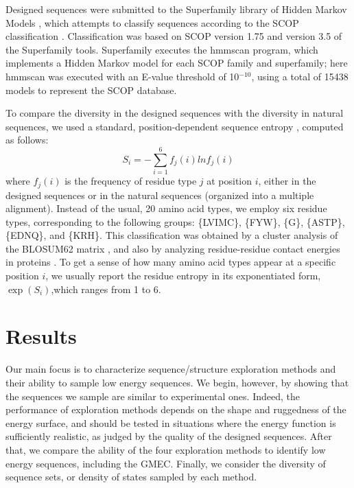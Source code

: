 Designed sequences were submitted to the Superfamily library of Hidden Markov Models \cite{Gough01,Wilson07}, which attempts to classify sequences according to the SCOP classification \cite{Andreeva04}. Classification was based on SCOP version 1.75 and version 3.5 of the Superfamily tools. Superfamily executes the hmmscan program, which implements a Hidden Markov model for each SCOP family and superfamily; here hmmscan was executed with an E-value threshold of 10$^{-10}$, using a total of 15438 models to represent the SCOP database.

To compare the diversity in the designed sequences with the diversity in natural sequences, we used a standard, position-dependent sequence entropy \cite{DurbinBK}, computed as follows:
\begin{equation} \label{eq:entropy}
S_i = - \sum_{i=1}^6 f_j (i) ln f_j (i)
\end{equation}
where $f_j(i)$ is the frequency of residue type $j$ at position $i$, either in the designed sequences or in the natural sequences (organized into a multiple alignment). Instead of the usual, 20 amino acid types, we employ six residue types, corresponding to the following groups: \{LVIMC\}, \{FYW\}, \{G\}, \{ASTP\}, \{EDNQ\}, and \{KRH\}. This classification was obtained by a cluster analysis of the BLOSUM62 matrix \cite{Murphy00}, and also by analyzing residue-residue contact energies in proteins \cite{Launay07}. To get a sense of how many amino acid types appear at a specific position $i$, we usually report the residue entropy in its exponentiated form, $\exp(S_i)$,which ranges from 1 to 6. 

\section{Results}
Our main focus is to characterize sequence/structure exploration methods and their ability to sample low energy sequences. We begin, however, by showing that the sequences we sample are similar to experimental ones. Indeed, the performance of exploration methods depends on the shape and ruggedness of the energy surface, and should be tested in situations where the energy function is sufficiently realistic, as judged by the quality of the designed sequences. After that, we compare the ability of the four exploration methods to identify low energy sequences, including the GMEC. Finally, we consider the diversity of sequence sets, or density of states sampled by each method.

